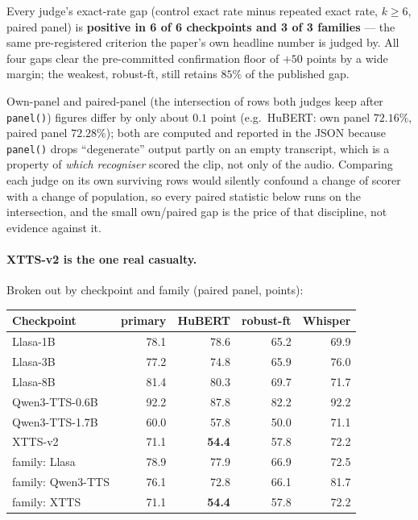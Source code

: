\documentclass[11pt]{article}
\begin{document}
\noindent Every judge's exact-rate gap (control exact rate minus repeated
exact rate, $k\ge6$, paired panel) is \textbf{positive in 6 of 6 checkpoints
and 3 of 3 families} --- the same pre-registered criterion the paper's own
headline number is judged by. All four gaps clear the pre-committed
confirmation floor of $+50$ points by a wide margin; the weakest, robust-ft,
still retains $85\%$ of the published gap.

Own-panel and paired-panel (the intersection of rows both judges keep after
\texttt{panel()}) figures differ by only about $0.1$ point (e.g.\ HuBERT: own
panel $72.16\%$, paired panel $72.28\%$); both are computed and reported in
the JSON because \texttt{panel()} drops ``degenerate'' output partly on an
empty transcript, which is a property of \emph{which recogniser} scored the
clip, not only of the audio. Comparing each judge on its own surviving rows
would silently confound a change of scorer with a change of population, so
every paired statistic below runs on the intersection, and the small own/paired
gap is the price of that discipline, not evidence against it.

\paragraph{XTTS-v2 is the one real casualty.} Broken out by checkpoint and
family (paired panel, points):

\begin{center}
\small
\begin{tabular}{lrrrr}
\toprule
Checkpoint & primary & HuBERT & robust-ft & Whisper \\
\midrule
Llasa-1B & 78.1 & 78.6 & 65.2 & 69.9 \\
Llasa-3B & 77.2 & 74.8 & 65.9 & 76.0 \\
Llasa-8B & 81.4 & 80.3 & 69.7 & 71.7 \\
Qwen3-TTS-0.6B & 92.2 & 87.8 & 82.2 & 92.2 \\
Qwen3-TTS-1.7B & 60.0 & 57.8 & 50.0 & 71.1 \\
XTTS-v2 & 71.1 & \textbf{54.4} & 57.8 & 72.2 \\
\midrule
family: Llasa & 78.9 & 77.9 & 66.9 & 72.5 \\
family: Qwen3-TTS & 76.1 & 72.8 & 66.1 & 81.7 \\
family: XTTS & 71.1 & \textbf{54.4} & 57.8 & 72.2 \\
\bottomrule
\end{tabular}
\end{center}
\end{document}
